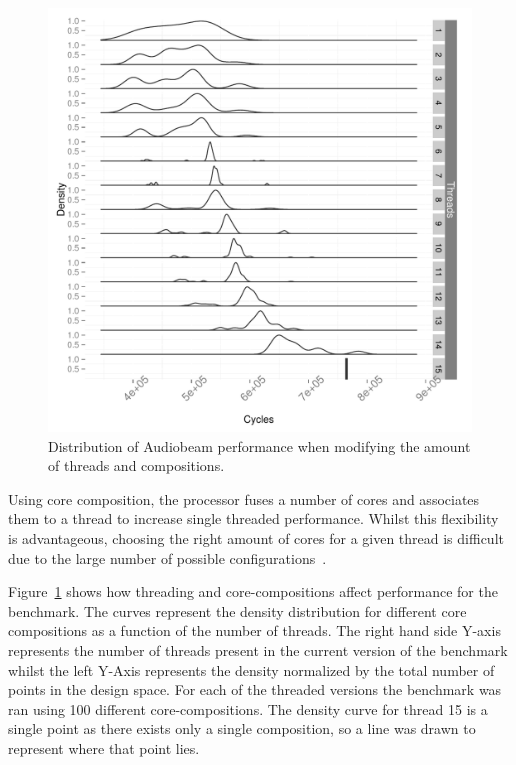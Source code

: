 \begin{figure}[h]
  \includegraphics[width=1\textwidth]{streamit-paper/graphics/audiobeam_tots.pdf}
  \caption{Distribution of Audiobeam performance when modifying the amount of threads and compositions.}\label{fig:audiototal}
\end{figure}

Using core composition, the processor fuses a number of cores and associates them to a thread to increase single threaded performance.
Whilst this flexibility is advantageous, choosing the right amount of cores for a given thread is difficult due to the large number of possible configurations~\cite{gulati2008multitaskingdmc}.

Figure~\ref{fig:audiototal} shows how threading and core-compositions affect performance for the  benchmark.
The curves represent the density distribution for different core compositions as a function of the number of threads.
The right hand side Y-axis represents the number of threads present in the current version of the benchmark whilst the left Y-Axis represents the density normalized by the total number of points in the design space.
For each of the threaded versions the benchmark was ran using 100 different core-compositions.
The density curve for thread 15 is a single point as there exists only a single composition, so a line was drawn to represent where that point lies.

